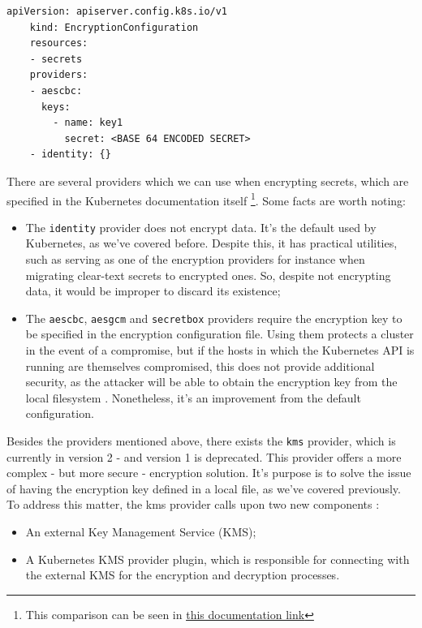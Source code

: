 \documentclass[a4paper,11pt,openright,BCOR=15mm]{scrbook}
\begin{document}
\begin{lstlisting}[style=yaml,caption={EncryptionConfig example},label=code:encConfig]
	apiVersion: apiserver.config.k8s.io/v1
	kind: EncryptionConfiguration
	resources:
	- secrets
	providers:
	- aescbc:
	  keys:
	    - name: key1
	      secret: <BASE 64 ENCODED SECRET>
	- identity: {}
\end{lstlisting}

There are several providers which we can use when encrypting secrets, which are specified in the Kubernetes documentation itself \footnote{This comparison can be seen in \href{https://kubernetes.io/docs/tasks/administer-cluster/encrypt-data/\#providers}{\underline{this documentation link}}}. Some facts are worth noting:

\begin{itemize}
	\item The \texttt{identity} provider does not encrypt data. It's the default used by Kubernetes, as we've covered before. Despite this, it has practical utilities, such as serving as one of the encryption providers for instance when migrating clear-text secrets to encrypted ones. So, despite not encrypting data, it would be improper to discard its existence;
	\item The \texttt{aescbc}, \texttt{aesgcm} and \texttt{secretbox} providers require the encryption key to be specified in the encryption configuration file. Using them protects a cluster in the event of a compromise, but if the hosts in which the Kubernetes API is running are themselves compromised, this does not provide additional security, as the attacker will be able to obtain the encryption key from the local filesystem \cite{gkatziouras_kubernetes_2024}. Nonetheless, it's an improvement from the default configuration.
\end{itemize}

Besides the providers mentioned above, there exists the \texttt{kms} provider, which is currently in version 2 - and version 1 is deprecated. This provider offers a more complex - but more secure - encryption solution. It's purpose is to solve the issue of having the encryption key defined in a local file, as we've covered previously. To address this matter, the kms provider calls upon two new components \cite{gkatziouras_kubernetes_2024}: 

\begin{itemize}
	\item An external Key Management Service (KMS);
	\item A Kubernetes KMS provider plugin, which is responsible for connecting with the external KMS for the encryption and decryption processes.
\end{itemize}
\end{document}
